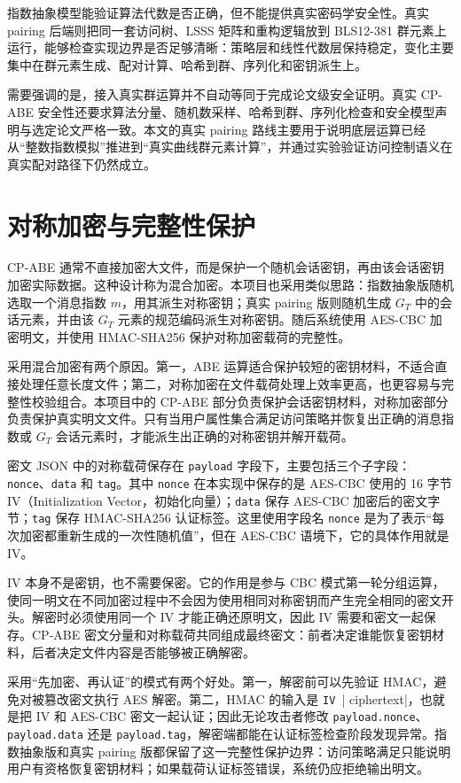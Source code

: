 指数抽象模型能验证算法代数是否正确，但不能提供真实密码学安全性。真实 pairing 后端则把同一套访问树、LSSS 矩阵和重构逻辑放到 BLS12-381 群元素上运行，能够检查实现边界是否足够清晰：策略层和线性代数层保持稳定，变化主要集中在群元素生成、配对计算、哈希到群、序列化和密钥派生上。

需要强调的是，接入真实群运算并不自动等同于完成论文级安全证明。真实 CP-ABE 安全性还要求算法分量、随机数采样、哈希到群、序列化检查和安全模型声明与选定论文严格一致。本文的真实 pairing 路线主要用于说明底层运算已经从“整数指数模拟”推进到“真实曲线群元素计算”，并通过实验验证访问控制语义在真实配对路径下仍然成立。

\section{对称加密与完整性保护}

CP-ABE 通常不直接加密大文件，而是保护一个随机会话密钥，再由该会话密钥加密实际数据。这种设计称为混合加密。本项目也采用类似思路：指数抽象版随机选取一个消息指数 $m$，用其派生对称密钥；真实 pairing 版则随机生成 $G_T$ 中的会话元素，并由该 $G_T$ 元素的规范编码派生对称密钥。随后系统使用 AES-CBC 加密明文，并使用 HMAC-SHA256 保护对称加密载荷的完整性。

采用混合加密有两个原因。第一，ABE 运算适合保护较短的密钥材料，不适合直接处理任意长度文件；第二，对称加密在文件载荷处理上效率更高，也更容易与完整性校验组合。本项目中的 CP-ABE 部分负责保护会话密钥材料，对称加密部分负责保护真实明文文件。只有当用户属性集合满足访问策略并恢复出正确的消息指数或 $G_T$ 会话元素时，才能派生出正确的对称密钥并解开载荷。

密文 JSON 中的对称载荷保存在 \verb|payload| 字段下，主要包括三个子字段：\verb|nonce|、\verb|data| 和 \verb|tag|。其中 \verb|nonce| 在本实现中保存的是 AES-CBC 使用的 16 字节 IV（Initialization Vector，初始化向量）；\verb|data| 保存 AES-CBC 加密后的密文字节；\verb|tag| 保存 HMAC-SHA256 认证标签。这里使用字段名 \verb|nonce| 是为了表示“每次加密都重新生成的一次性随机值”，但在 AES-CBC 语境下，它的具体作用就是 IV。

IV 本身不是密钥，也不需要保密。它的作用是参与 CBC 模式第一轮分组运算，使同一明文在不同加密过程中不会因为使用相同对称密钥而产生完全相同的密文开头。解密时必须使用同一个 IV 才能正确还原明文，因此 IV 需要和密文一起保存。CP-ABE 密文分量和对称载荷共同组成最终密文：前者决定谁能恢复密钥材料，后者决定文件内容是否能够被正确解密。

采用“先加密、再认证”的模式有两个好处。第一，解密前可以先验证 HMAC，避免对被篡改密文执行 AES 解密。第二，HMAC 的输入是 \verb|IV || ciphertext|，也就是把 IV 和 AES-CBC 密文一起认证；因此无论攻击者修改 \verb|payload.nonce|、\verb|payload.data| 还是 \verb|payload.tag|，解密端都能在认证标签检查阶段发现异常。指数抽象版和真实 pairing 版都保留了这一完整性保护边界：访问策略满足只能说明用户有资格恢复密钥材料；如果载荷认证标签错误，系统仍应拒绝输出明文。

